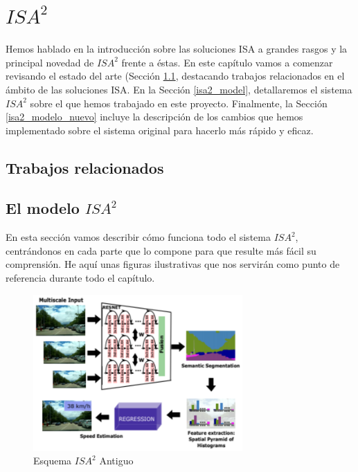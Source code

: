 \chapter{$ISA^{2}$}

Hemos hablado en la introducción sobre las soluciones \ac{ISA} a grandes rasgos y la principal novedad de $ISA^{2}$ frente a éstas. En este capítulo vamos a comenzar revisando el estado del arte (Sección \ref{sec:isa2_estado_del_arte}, destacando trabajos relacionados en el ámbito de las soluciones \ac{ISA}. En la Sección \ref{isa2_model}, detallaremos el sistema $ISA^{2}$ sobre el que hemos trabajado en este proyecto. Finalmente, la Sección \ref{isa2_modelo_nuevo} incluye la descripción de los cambios que hemos implementado sobre el sistema original para hacerlo más rápido y eficaz.


\section{Trabajos relacionados}
\label{sec:isa2_estado_del_arte}

\section{El modelo $ISA^{2}$}
\label{sec:isa2_model}

En esta sección vamos describir cómo funciona todo el sistema $ISA^{2}$, centrándonos en cada parte que lo compone para que resulte más fácil su comprensión. He aquí unas figuras ilustrativas que nos servirán como punto de referencia durante todo el capítulo.


\begin{figure}[H]
  \centering
  \includegraphics[width=8cm]{Figuras/Figura_Esquema_ISA2_Version_1_SegSem.eps}
  \caption{Esquema $ISA^{2}$ Antiguo}
  \label{fig:Isa_v1}
\end{figure}

